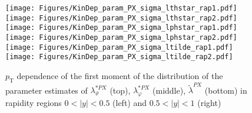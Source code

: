 \documentclass[12pt]{article}
\newcommand{\pT}{p_\mathrm{T}}
\newcommand{\absy}{\left |  y \right |}
\newcommand{\lamtildePX}{\tilde{\lambda}^{\scriptscriptstyle PX}}
\newcommand{\lamthstarPX}{\lambda^{* \scriptscriptstyle PX}_\vartheta}
\newcommand{\lamphstarPX}{\lambda^{* \scriptscriptstyle PX}_\varphi}
\begin{document}
\begin{figure}[htbp]
\centering
\texttt{[image: Figures/KinDep\_param\_PX\_sigma\_lthstar\_rap1.pdf]}
\texttt{[image: Figures/KinDep\_param\_PX\_sigma\_lthstar\_rap2.pdf]}
\texttt{[image: Figures/KinDep\_param\_PX\_sigma\_lphstar\_rap1.pdf]}
\texttt{[image: Figures/KinDep\_param\_PX\_sigma\_lphstar\_rap2.pdf]}
\texttt{[image: Figures/KinDep\_param\_PX\_sigma\_ltilde\_rap1.pdf]}
\texttt{[image: Figures/KinDep\_param\_PX\_sigma\_ltilde\_rap2.pdf]}
\caption{$\pT$ dependence of the first moment of the distribution of the parameter estimates of $\lamthstarPX$ (top), $\lamphstarPX$ (middle), $\lamtildePX$ (bottom) in rapidity regions $0<\absy<0.5$ (left) and $0.5<\absy<1$ (right)}
\end{figure}
\clearpage
\end{document}

